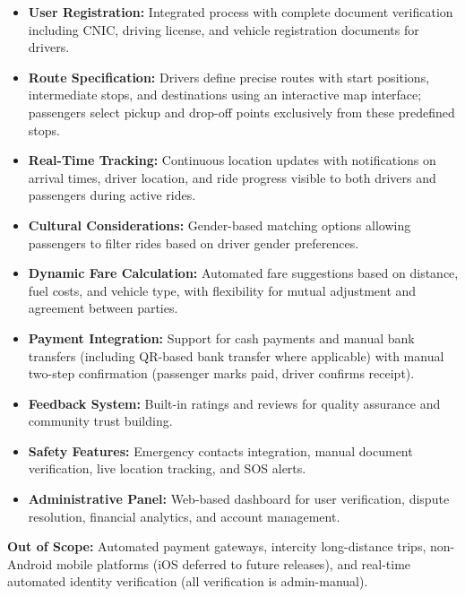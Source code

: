 \begin{itemize}
    \item \textbf{User Registration:} Integrated process with complete document verification including CNIC, driving license, and vehicle registration documents for drivers.
    
    \item \textbf{Route Specification:} Drivers define precise routes with start positions, intermediate stops, and destinations using an interactive map interface; passengers select pickup and drop-off points exclusively from these predefined stops.
    
    \item \textbf{Real-Time Tracking:} Continuous location updates with notifications on arrival times, driver location, and ride progress visible to both drivers and passengers during active rides.
    
    \item \textbf{Cultural Considerations:} Gender-based matching options allowing passengers to filter rides based on driver gender preferences.
    
    \item \textbf{Dynamic Fare Calculation:} Automated fare suggestions based on distance, fuel costs, and vehicle type, with flexibility for mutual adjustment and agreement between parties.
    
    \item \textbf{Payment Integration:} Support for cash payments and manual bank transfers (including QR-based bank transfer where applicable) with manual two-step confirmation (passenger marks paid, driver confirms receipt).
    
    \item \textbf{Feedback System:} Built-in ratings and reviews for quality assurance and community trust building.
    
    \item \textbf{Safety Features:} Emergency contacts integration, manual document verification, live location tracking, and SOS alerts.
    
    \item \textbf{Administrative Panel:} Web-based dashboard for user verification, dispute resolution, financial analytics, and account management.
\end{itemize}

\textbf{Out of Scope:} Automated payment gateways, intercity long-distance trips, non-Android mobile platforms (iOS deferred to future releases), and real-time automated identity verification (all verification is admin-manual).

